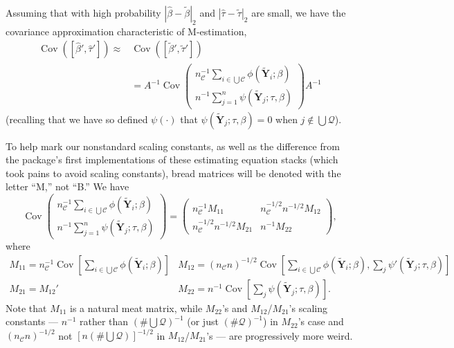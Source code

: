 \documentclass{article}
\begin{document}
Assuming that with high probability $|\hat\beta -\tilde\beta|_{2}$ and
$|\hat\tau -\tilde\tau|_{2}$ are small, 
we have the covariance approximation characteristic of M-estimation,
\begin{align*} \operatorname{Cov}([\hat\beta',\hat\tau']) \approx&
  \operatorname{Cov}([\tilde\beta',\tilde\tau'])\\
  &=
  A^{-1} \operatorname{Cov}\left(
     \begin{array}{c}
       n_{\mathcal{C}}^{-1}\sum_{i\in \bigcup \mathcal{C}}\phi(\tilde{\mathbf{Y}}_{i}; \beta )\\
       n^{-1}\sum_{j=1}^{n}\psi(\tilde{\mathbf{Y}}_{j}; \tau, \beta )
     \end{array}
\right)A^{-1}
\end{align*}
(recalling that we have so defined $\psi(\cdot)$ that $\psi(\tilde{\mathbf{Y}}_{j}; \tau, \beta) = 0$ when
$j\not\in \bigcup \mathcal{Q}$).


To help mark our nonstandard scaling constants, as well as the difference from the package's first implementations of these estimating equation stacks (which took pains to avoid scaling constants), 
bread matrices will be denoted with the letter ``M,'' not ``B.''
We have
\[
\operatorname{Cov}\left(
     \begin{array}{c}
       n_{\mathcal{C}}^{-1}\sum_{i\in \bigcup \mathcal{C}}\phi(\tilde{\mathbf{Y}}_{i}; \beta )\\
       n^{-1}\sum_{j=1}^{n}\psi(\tilde{\mathbf{Y}}_{j}; \tau, \beta )
     \end{array}
\right) = \left(
  \begin{array}{cc}
    n_{\mathcal{C}}^{-1}M_{11}& n_{\mathcal{C}}^{-1/2}n^{-1/2} M_{12}\\
    n_{\mathcal{C}}^{-1/2}n^{-1/2} M_{21} & n^{-1}M_{22}
  \end{array}
\right),
\]
where
\[
  \begin{array}{cc}
    M_{11}  = n_{\mathcal{C}}^{-1}\operatorname{Cov}[\sum_{i\in \bigcup
             \mathcal{C}} \phi(\tilde{\mathbf{Y}}_{i}; \beta )] &
                                                                  M_{12}=
                                                                  (n_{\mathcal{C}}n)^{-1/2} \operatorname{Cov}[\sum_{i\in \bigcup
             \mathcal{C}}\phi(\tilde{\mathbf{Y}}_{i};
                                                                  \beta
                                                                  ), \sum_{j}\psi'(\tilde{\mathbf{Y}}_{j}; \tau, \beta )]\\
    M_{21}=M_{12}' & M_{22} = n^{-1}\operatorname{Cov}[\sum_{j}\psi(\tilde{\mathbf{Y}}_{j};
                     \tau, \beta )] .
    \end{array}
\]
Note that $M_{11}$ is a natural meat matrix, while $M_{22}$'s and
$M_{12}$/$M_{21}$'s scaling constants --- $n^{-1}$ rather than $(\# \bigcup
\mathcal{Q})^{-1}$ (or just $(\# \mathcal{Q})^{-1}$) in $M_{22}$'s
case and $(n_{\mathcal{C}}n)^{-1/2}$ not $[n (\# \bigcup
\mathcal{Q})]^{-1/2}$ in $M_{12}$/$M_{21}$'s --- are progressively more weird.
\end{document}
